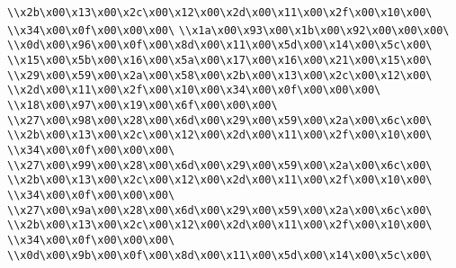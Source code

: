 \verb|\\x2b\x00\x13\x00\x2c\x00\x12\x00\x2d\x00\x11\x00\x2f\x00\x10\x00\|\newline
\verb|\\x34\x00\x0f\x00\x00\x00\|\newline
\verb|\\x1a\x00\x93\x00\x1b\x00\x92\x00\x00\x00\|\newline
\verb|\\x0d\x00\x96\x00\x0f\x00\x8d\x00\x11\x00\x5d\x00\x14\x00\x5c\x00\|\newline
\verb|\\x15\x00\x5b\x00\x16\x00\x5a\x00\x17\x00\x16\x00\x21\x00\x15\x00\|\newline
\verb|\\x29\x00\x59\x00\x2a\x00\x58\x00\x2b\x00\x13\x00\x2c\x00\x12\x00\|\newline
\verb|\\x2d\x00\x11\x00\x2f\x00\x10\x00\x34\x00\x0f\x00\x00\x00\|\newline
\verb|\\x18\x00\x97\x00\x19\x00\x6f\x00\x00\x00\|\newline
\verb|\\x27\x00\x98\x00\x28\x00\x6d\x00\x29\x00\x59\x00\x2a\x00\x6c\x00\|\newline
\verb|\\x2b\x00\x13\x00\x2c\x00\x12\x00\x2d\x00\x11\x00\x2f\x00\x10\x00\|\newline
\verb|\\x34\x00\x0f\x00\x00\x00\|\newline
\verb|\\x27\x00\x99\x00\x28\x00\x6d\x00\x29\x00\x59\x00\x2a\x00\x6c\x00\|\newline
\verb|\\x2b\x00\x13\x00\x2c\x00\x12\x00\x2d\x00\x11\x00\x2f\x00\x10\x00\|\newline
\verb|\\x34\x00\x0f\x00\x00\x00\|\newline
\verb|\\x27\x00\x9a\x00\x28\x00\x6d\x00\x29\x00\x59\x00\x2a\x00\x6c\x00\|\newline
\verb|\\x2b\x00\x13\x00\x2c\x00\x12\x00\x2d\x00\x11\x00\x2f\x00\x10\x00\|\newline
\verb|\\x34\x00\x0f\x00\x00\x00\|\newline
\verb|\\x0d\x00\x9b\x00\x0f\x00\x8d\x00\x11\x00\x5d\x00\x14\x00\x5c\x00\|\newline

